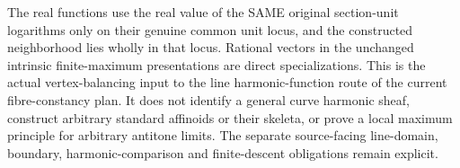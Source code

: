 \begin{remark}
The real functions use the real value of the SAME original section-unit
logarithms only on their genuine common unit locus, and the constructed
neighborhood lies wholly in that locus. Rational vectors in the unchanged
intrinsic finite-maximum presentations are direct specializations.
This is the actual vertex-balancing input to the line harmonic-function
route of the current fibre-constancy plan. It does not identify a general
curve harmonic sheaf, construct arbitrary standard affinoids or their
skeleta, or prove a local maximum principle for arbitrary antitone limits.
The separate source-facing line-domain, boundary, harmonic-comparison and
finite-descent obligations remain explicit.
\end{remark}
